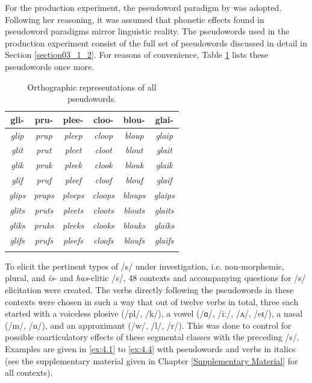 For the production experiment, the pseudoword paradigm by \citet{Berko1958} was adopted. Following her reasoning, it was assumed that phonetic effects found in pseudoword paradigms mirror linguistic reality. The pseudowords used in the production experiment consist of the full set of pseudowords discussed in detail in Section \ref{section03_1_2}. For reasons of convenience, Table \ref{tab:4.1} lists these pseudowords once more.

\begin{table}\fontsize{10}{11}
\caption{Orthographic representations of all pseudowords.}
\label{tab:4.1}
\centering
\begin{tabular}{cccccc} 
\lsptoprule
gli-           & pru-           & plee-           & cloo-           & blou-           & glai-            \\ 
\midrule
\textit{glip}  & \textit{prup}  & \textit{pleep}  & \textit{cloop}  & \textit{bloup}  & \textit{glaip}   \\
\textit{glit}  & \textit{prut}  & \textit{pleet}  & \textit{cloot}  & \textit{blout}  & \textit{glait}   \\
\textit{glik}  & \textit{pruk}  & \textit{pleek}  & \textit{clook}  & \textit{blouk}  & \textit{glaik}   \\
\textit{glif}  & \textit{pruf}  & \textit{pleef}  & \textit{cloof}  & \textit{blouf}  & \textit{glaif}   \\ 
\midrule
\textit{glips} & \textit{prups} & \textit{pleeps} & \textit{cloops} & \textit{bloups} & \textit{glaips}  \\
\textit{glits} & \textit{pruts} & \textit{pleets} & \textit{cloots} & \textit{blouts} & \textit{glaits}  \\
\textit{gliks} & \textit{pruks} & \textit{pleeks} & \textit{clooks} & \textit{blouks} & \textit{glaiks}  \\
\textit{glifs} & \textit{prufs} & \textit{pleefs} & \textit{cloofs} & \textit{bloufs} & \textit{glaifs}  \\
\lspbottomrule
\end{tabular}
\end{table}

To elicit the pertinent types of /s/ under investigation, i.e. non-morphemic, plural, and \textit{is}- and \textit{has}-clitic /s/, 48 contexts and accompanying questions for /s/ elicitation were created. The verbs directly following the pseudowords in these contexts were chosen in such a way that out of twelve verbs in total, three each started with a voiceless plosive (/pl/, /k/), a vowel (/ɑ/, /i:/, /ʌ/, /eɪ/), a nasal (/m/, /n/), and an approximant (/w/, /l/, /r/). This was done to control for possible coarticulatory effects of these segmental classes with the preceding /s/. Examples are given in \ref{ex:4.1} to \ref{ex:4.4} with pseudowords and verbs in italics (see the supplementary material given in Chapter \ref{Supplementary Material} for all contexts).

